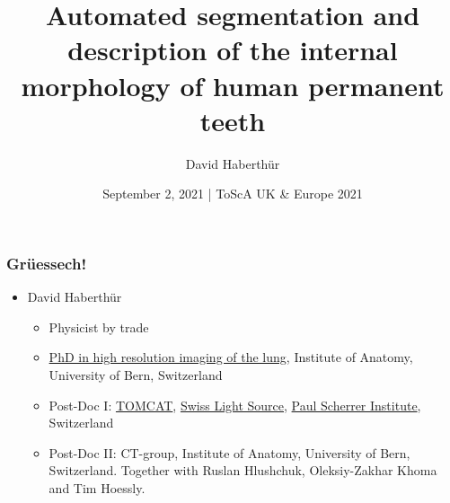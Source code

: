 \documentclass[aspectratio=169]{beamer}
\title{Automated segmentation and description of the internal morphology of human permanent teeth}
\author{David Haberthür}
\date{September 2, 2021 | ToScA UK \& Europe 2021}
\newcommand{\uct}{\si{\micro}CT\xspace}%
\begin{document}
{%
	\begin{frame}%
		\maketitle
	\end{frame}%
}

\begin{frame}
	\frametitle{Grüessech!}
	\begin{itemize}
		\item David Haberthür
		\begin{itemize}
			\item Physicist by trade
			\item \href{https://boris.unibe.ch/2619/}{PhD in high resolution imaging of the lung}, Institute of Anatomy, University of Bern, Switzerland
			\item Post-Doc I: \href{https://www.psi.ch/sls/tomcat/}{TOMCAT}, \href{https://www.psi.ch/sls/}{Swiss Light Source}, \href{https://www.psi.ch/}{Paul Scherrer Institute}, Switzerland
			\item Post-Doc II: \uct-group, Institute of Anatomy, University of Bern, Switzerland.\newline
				Together with Ruslan Hlushchuk, Oleksiy-Zakhar Khoma and Tim Hoessly.
		\end{itemize}
	\end{itemize}
\end{frame}
\end{document}
